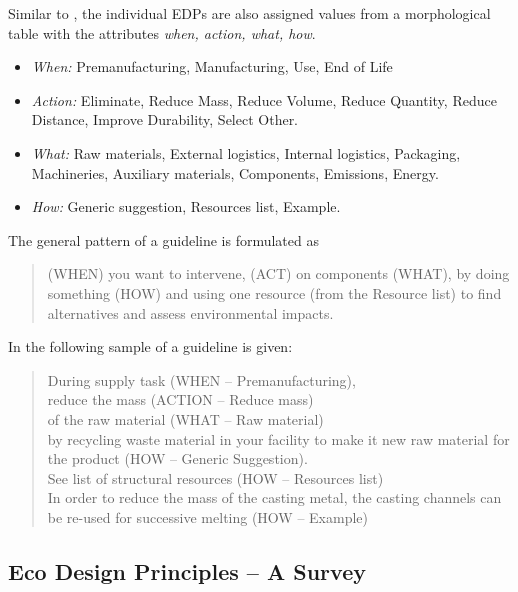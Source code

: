 \documentclass[11pt,a4paper]{article}
\begin{document}
Similar to \cite{Gassmann2014}, the individual EDPs are also assigned values
from a morphological table with the attributes \emph{when, action, what,
  how}.
\begin{itemize}
\item \emph{When:} Premanufacturing, Manufacturing, Use, End of Life
\item \emph{Action:} Eliminate, Reduce Mass, Reduce Volume, Reduce Quantity,
  Reduce Distance, Improve Durability, Select Other.
\item \emph{What:} Raw materials, External logistics, Internal logistics,
  Packaging, Machineries, Auxiliary materials, Components, Emissions, Energy.
\item \emph{How:} Generic suggestion, Resources list, Example.
\end{itemize}
The general pattern of a guideline is formulated as 
\begin{quote}
  (WHEN) you want to intervene, (ACT) on components (WHAT), by doing
  something (HOW) and using one resource (from the Resource list) to find
  alternatives and assess environmental impacts.  
\end{quote}
In \cite[Fig. 2]{Russo2020} the following sample of a guideline is given: 
\begin{quote}
  During supply task (WHEN -- Premanufacturing),\\ reduce the mass (ACTION --
  Reduce mass)\\ of the raw material (WHAT -- Raw material)\\ by recycling
  waste material in your facility to make it new raw material for the product
  (HOW -- Generic Suggestion). \\
  See list of structural resources (HOW -- Resources list)\\
  In order to reduce the mass of the casting metal, the casting channels can
  be re-used for successive melting (HOW -- Example) 
\end{quote}

\subsection{Eco Design Principles -- A Survey}
\end{document}
